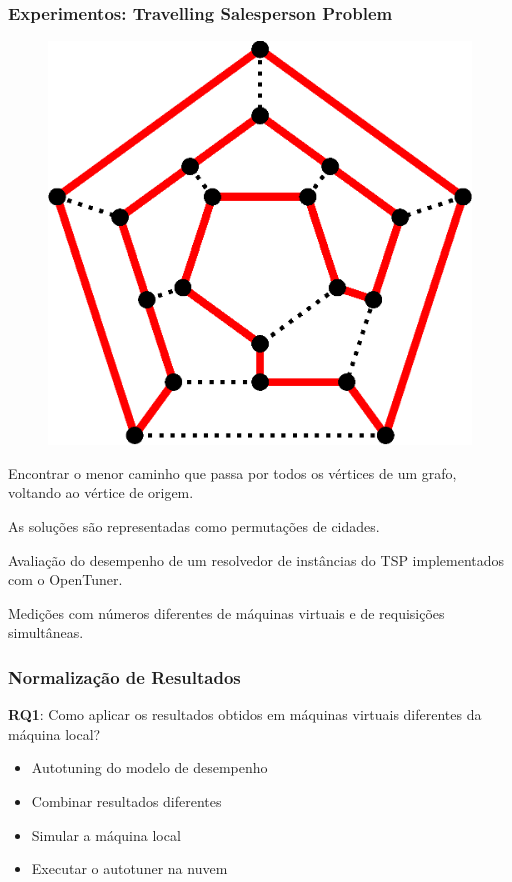 \documentclass[10pt, compress]{beamer}
\begin{document}
\begin{frame}[fragile]
    \frametitle{Experimentos: Travelling Salesperson Problem}
    \begin{figure}[H]
        \centering
        \includegraphics[width=.33\textwidth]{hamiltonianpath}
    \end{figure}%
    Encontrar o \alert{menor caminho} que passa por todos os vértices de um
    grafo, \alert{voltando ao vértice de origem}.

    As soluções são representadas como \alert{permutações} de cidades.

    \alert{Avaliação do desempenho} de um resolvedor de
    instâncias do TSP implementados com o OpenTuner. 

    Medições com números diferentes de \alert{máquinas virtuais} e de
    \alert{requisições simultâneas}.
\end{frame}

\begin{frame}[fragile]
  \frametitle{Normalização de Resultados}
  \textbf{RQ1}: Como aplicar os resultados obtidos em máquinas virtuais
  \alert{diferentes da máquina local}?

  \begin{itemize}
      \item Autotuning do \alert{modelo de desempenho}
      \item \alert{Combinar} resultados diferentes
      \item \alert{Simular} a máquina local
      \item Executar o autotuner na \alert{nuvem}
  \end{itemize}
\end{frame}


\maketitle
\end{document}
